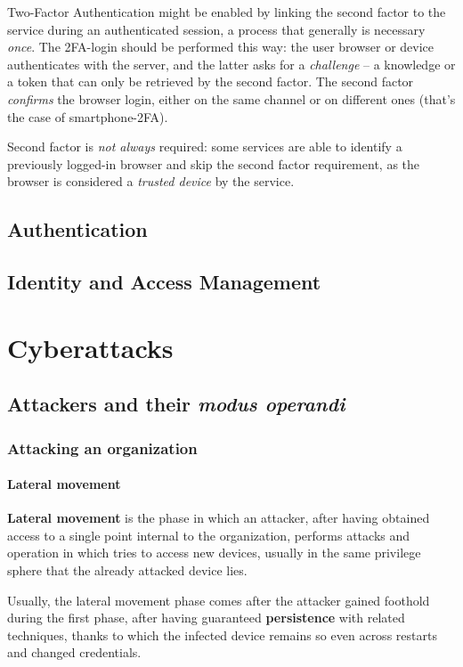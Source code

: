 \documentclass[10pt]{extbook}
\begin{document}
Two\--Factor Authentication might be enabled by linking the second factor to
the service during an authenticated session, a process that generally is
necessary \emph{once}. The 2FA\--login should be performed this way: the user
browser or device authenticates with the server, and the latter asks for a
\emph{challenge} -- a knowledge or a token that can only be retrieved by the
second factor. The second factor \emph{confirms} the browser login, either on
the same channel or on different ones (that's the case of smartphone\--2FA).

Second factor is \emph{not always} required: some services are able to identify
a previously logged\--in browser and skip the second factor requirement, as the
browser is considered a \emph{trusted device} by the service.

\chapter{Authentication}
\chapter{Identity and Access Management}



\part{Cyberattacks}

\chapter{Attackers and their \emph{modus operandi}}

\section{Attacking an organization}

\subsection{Lateral movement}

\textbf{Lateral movement} is the phase in which an attacker, after having
obtained access to a single point internal to the organization, performs
attacks and operation in which tries to access new devices, usually in the same
privilege sphere that the already attacked device lies. 

Usually, the lateral
movement phase comes after the attacker gained foothold during the first phase,
after having guaranteed \textbf{persistence} with related techniques, thanks to
which the infected device remains so even across restarts and changed
credentials. 
\end{document}
